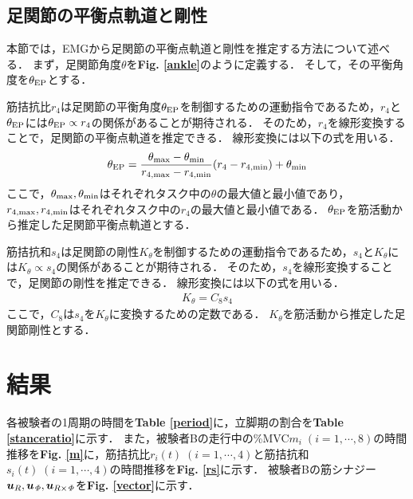 \subsection{足関節の平衡点軌道と剛性}
本節では，EMGから足関節の平衡点軌道と剛性を推定する方法について述べる．
まず，足関節角度$\theta$を{\bf Fig. \ref{ankle}}のように定義する．
そして，その平衡角度を$\theta_{\rm EP}$とする．

筋拮抗比$r_4$は足関節の平衡角度$\theta_{\rm EP}$を制御するための運動指令であるため，$r_4$と$\theta_{\rm EP}$には$\theta_{\rm EP}\propto r_4$の関係があることが期待される\cite{Ariga2013}．
そのため，$r_4$を線形変換することで，足関節の平衡点軌道を推定できる．
線形変換には以下の式を用いる．
\begin{eqnarray}
 \theta_{\rm EP}=\frac{\theta_{\rm max}-\theta_{\rm min}}{r_{4,{\rm max}}-r_{4,{\rm min}}}(r_4-r_{4,{\rm min}})+\theta_{\rm min}
\end{eqnarray}
ここで，$\theta_{\rm max},\theta_{\rm min}$はそれぞれタスク中の$\theta$の最大値と最小値であり，$r_{4,{\rm max}},r_{4,{\rm min}}$はそれぞれタスク中の$r_4$の最大値と最小値である．
$\theta_{\rm EP}$を筋活動から推定した足関節平衡点軌道とする．

筋拮抗和$s_4$は足関節の剛性$K_{\theta}$を制御するための運動指令であるため，$s_4$と$K_{\theta}$には$K_{\theta}\propto s_4$の関係があることが期待される\cite{Ariga2013}．
そのため，$s_4$を線形変換することで，足関節の剛性を推定できる．
線形変換には以下の式を用いる．
\begin{eqnarray}
 K_{\theta}=C_8s_4
\end{eqnarray}
ここで，$C_8$は$s_4$を$K_{\theta}$に変換するための定数である．
$K_{\theta}$を筋活動から推定した足関節剛性とする．

\section{結果}
各被験者の1周期の時間を{\bf Table \ref{period}}に，立脚期の割合を{\bf Table \ref{stanceratio}}に示す．
また，被験者Bの走行中の\%MVC$m_i\;(i=1,\cdots,8)$の時間推移を{\bf Fig. \ref{m}}に，筋拮抗比$r_i(t)\;(i=1,\cdots,4)$と筋拮抗和$s_i(t)\;(i=1,\cdots,4)$の時間推移を{\bf Fig. \ref{rs}}に示す．
被験者Bの筋シナジー$\mbox{\boldmath $u$}_R,\mbox{\boldmath $u$}_{\it \Phi},\mbox{\boldmath $u$}_{R\times{\it \Phi}}$を{\bf Fig. \ref{vector}}に示す．


